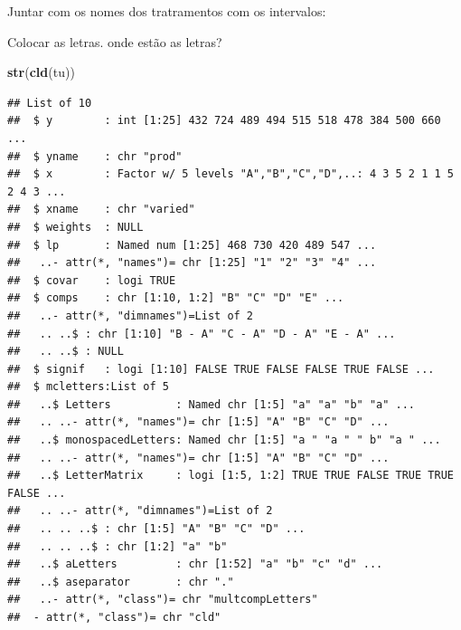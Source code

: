 \documentclass[
]{book}
\newenvironment{Shaded}{\begin{snugshade}}{\end{snugshade}}
\newcommand{\KeywordTok}[1]{\textcolor[rgb]{0.13,0.29,0.53}{\textbf{#1}}}
\newcommand{\NormalTok}[1]{#1}
\newcommand{\OperatorTok}[1]{\textcolor[rgb]{0.81,0.36,0.00}{\textbf{#1}}}
\newcommand{\StringTok}[1]{\textcolor[rgb]{0.31,0.60,0.02}{#1}}
\begin{document}
Juntar com os nomes dos tratramentos com os intervalos:

\begin{Shaded}
\end{Shaded}

Colocar as letras. onde estão as letras?

\begin{Shaded}
\begin{Highlighting}[]
\KeywordTok{str}\NormalTok{(}\KeywordTok{cld}\NormalTok{(tu))}
\end{Highlighting}
\end{Shaded}

\begin{verbatim}
## List of 10
##  $ y        : int [1:25] 432 724 489 494 515 518 478 384 500 660 ...
##  $ yname    : chr "prod"
##  $ x        : Factor w/ 5 levels "A","B","C","D",..: 4 3 5 2 1 1 5 2 4 3 ...
##  $ xname    : chr "varied"
##  $ weights  : NULL
##  $ lp       : Named num [1:25] 468 730 420 489 547 ...
##   ..- attr(*, "names")= chr [1:25] "1" "2" "3" "4" ...
##  $ covar    : logi TRUE
##  $ comps    : chr [1:10, 1:2] "B" "C" "D" "E" ...
##   ..- attr(*, "dimnames")=List of 2
##   .. ..$ : chr [1:10] "B - A" "C - A" "D - A" "E - A" ...
##   .. ..$ : NULL
##  $ signif   : logi [1:10] FALSE TRUE FALSE FALSE TRUE FALSE ...
##  $ mcletters:List of 5
##   ..$ Letters          : Named chr [1:5] "a" "a" "b" "a" ...
##   .. ..- attr(*, "names")= chr [1:5] "A" "B" "C" "D" ...
##   ..$ monospacedLetters: Named chr [1:5] "a " "a " " b" "a " ...
##   .. ..- attr(*, "names")= chr [1:5] "A" "B" "C" "D" ...
##   ..$ LetterMatrix     : logi [1:5, 1:2] TRUE TRUE FALSE TRUE TRUE FALSE ...
##   .. ..- attr(*, "dimnames")=List of 2
##   .. .. ..$ : chr [1:5] "A" "B" "C" "D" ...
##   .. .. ..$ : chr [1:2] "a" "b"
##   ..$ aLetters         : chr [1:52] "a" "b" "c" "d" ...
##   ..$ aseparator       : chr "."
##   ..- attr(*, "class")= chr "multcompLetters"
##  - attr(*, "class")= chr "cld"
\end{verbatim}

\begin{Shaded}
\end{Shaded}
\end{document}
